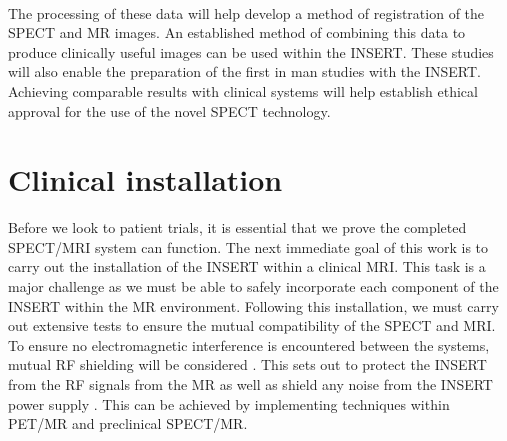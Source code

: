 \paragraph{}
The processing of these data will help develop a method of registration of the \acrshort{SPECT} and \acrshort{MR} images. An established method of combining this data to produce clinically useful images can be used within the \acrshort{INSERT}. These studies will also enable the preparation of the first in man studies with the \acrshort{INSERT}. Achieving comparable results with clinical systems will help establish ethical approval for the use of the novel \acrshort{SPECT} technology. 

\section{Clinical installation}
Before we look to patient trials, it is essential that we prove the completed \acrshort{SPECT/MRI} system can function. The next immediate goal of this work is to carry out the installation of the \acrshort{INSERT} within a clinical \acrshort{MRI}. This task is a major challenge as we must be able to safely incorporate each component of the \acrshort{INSERT} within the \acrshort{MR} environment. Following this installation, we must carry out extensive tests to ensure the mutual compatibility of the \acrshort{SPECT} and \acrshort{MRI}. To ensure no electromagnetic interference is encountered between the systems, mutual \acrshort{RF} shielding will be considered \cite{Lee2018LowApplications}. This sets out to protect the \acrshort{INSERT} from the \acrshort{RF} signals from the \acrshort{MR} as well as shield any noise from the \acrshort{INSERT} power supply \cite{Salvado2016ShieldingSystem}. This can be achieved by implementing techniques within \acrshort{PET/MR} \cite{Peng2014New7T} and preclinical \acrshort{SPECT/MR}.
